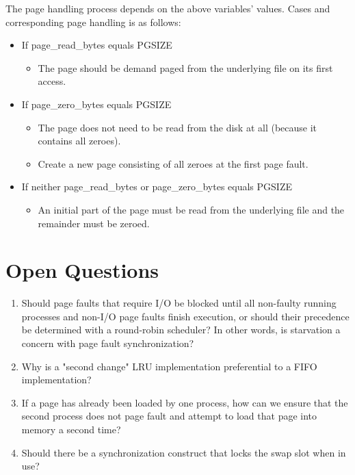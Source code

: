 \documentclass[11pt, letterpaper]{article}
\begin{document}
    The page handling process depends on the above variables’ values. Cases and 
corresponding page handling is as follows:

\begin{itemize}
\item If page\_read\_bytes equals PGSIZE
	\begin{itemize}
		\item The page should be demand paged from the underlying file on its first access.
	\end{itemize}
\item If page\_zero\_bytes equals PGSIZE
	\begin{itemize}
		\item The page does not need to be read from the disk at all (because it contains all zeroes).
		\item Create a new page consisting of all zeroes at the first page fault.
	\end{itemize}
\item If neither page\_read\_bytes or page\_zero\_bytes equals PGSIZE
	\begin{itemize}
		\item An initial part of the page must be read from the underlying file and the remainder must be 				  zeroed.
	\end{itemize}
\end{itemize}

\section*{Open Questions}

\begin{enumerate}
\item Should page faults that require I/O be blocked until all non-faulty running processes and non-I/O page faults finish execution, or should their precedence be determined with a round-robin scheduler? In other words, is starvation a concern with page fault synchronization?
\item Why is a "second change" LRU implementation preferential to a FIFO implementation?
\item If a page has already been loaded by one process, how can we ensure that the second process does not page fault and attempt to load that page into memory a second time?
\item Should there be a synchronization construct that locks the swap slot when in use?
\end{enumerate}
\end{document}
